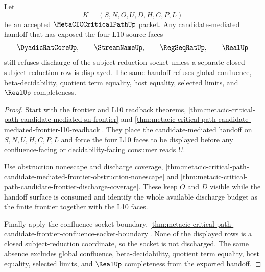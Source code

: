 \begin{theorem}
\label{thm:metacic-critical-path-candidate-frontier-discharge-refusal}
Let
$$
K=(S,N,O,U,D,H,C,P,L)
$$
be an accepted $\MetaCICCriticalPathUp$ packet. Any candidate-mediated handoff that has exposed the four L10 source faces
$$
\DyadicRatCoreUp,\qquad
\StreamNameUp,\qquad
\RegSeqRatUp,\qquad
\RealUp
$$
still refuses discharge of the subject-reduction socket unless a separate closed subject-reduction row is displayed. The same handoff refuses global confluence, beta-decidability, quotient term equality, host equality, selected limits, and $\RealUp$ completeness.
\end{theorem}
\begin{proof}
Start with the frontier and L10 readback theorems, \autoref{thm:metacic-critical-path-candidate-mediated-sn-frontier} and \autoref{thm:metacic-critical-path-candidate-mediated-frontier-l10-readback}. They place the candidate-mediated handoff on $S,N,U,H,C,P,L$ and force the four L10 faces to be displayed before any confluence-facing or decidability-facing consumer reads $U$.

Use obstruction nonescape and discharge coverage, \autoref{thm:metacic-critical-path-candidate-mediated-frontier-obstruction-nonescape} and \autoref{thm:metacic-critical-path-candidate-frontier-discharge-coverage}. These keep $O$ and $D$ visible while the handoff surface is consumed and identify the whole available discharge budget as the finite frontier together with the L10 faces.

Finally apply the confluence socket boundary, \autoref{thm:metacic-critical-path-candidate-frontier-confluence-socket-boundary}. None of the displayed rows is a closed subject-reduction coordinate, so the socket is not discharged. The same absence excludes global confluence, beta-decidability, quotient term equality, host equality, selected limits, and $\RealUp$ completeness from the exported handoff.
\end{proof}

